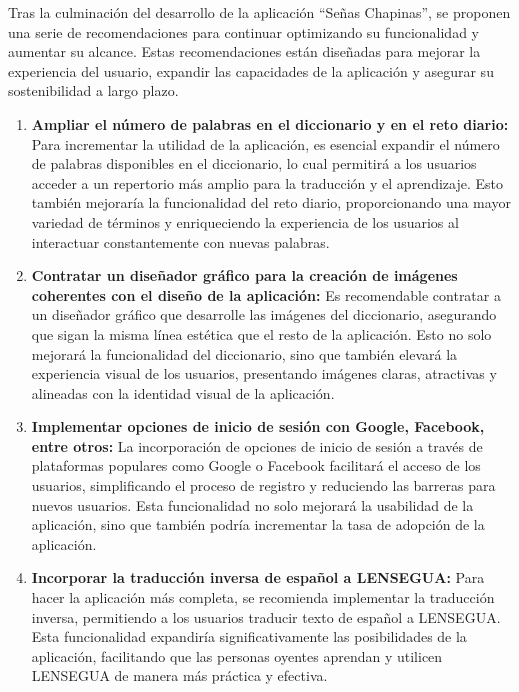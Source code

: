 
Tras la culminación del desarrollo de la aplicación ``Señas Chapinas'', se proponen una serie de recomendaciones para continuar optimizando su funcionalidad y aumentar su alcance. Estas recomendaciones están diseñadas para mejorar la experiencia del usuario, expandir las capacidades de la aplicación y asegurar su sostenibilidad a largo plazo.

\begin{enumerate}
    \item \textbf{Ampliar el número de palabras en el diccionario y en el reto diario:} 
    Para incrementar la utilidad de la aplicación, es esencial expandir el número de palabras disponibles en el diccionario, lo cual permitirá a los usuarios acceder a un repertorio más amplio para la traducción y el aprendizaje. Esto también mejoraría la funcionalidad del reto diario, proporcionando una mayor variedad de términos y enriqueciendo la experiencia de los usuarios al interactuar constantemente con nuevas palabras.

    \item \textbf{Contratar un diseñador gráfico para la creación de imágenes coherentes con el diseño de la aplicación:} 
    Es recomendable contratar a un diseñador gráfico que desarrolle las imágenes del diccionario, asegurando que sigan la misma línea estética que el resto de la aplicación. Esto no solo mejorará la funcionalidad del diccionario, sino que también elevará la experiencia visual de los usuarios, presentando imágenes claras, atractivas y alineadas con la identidad visual de la aplicación.

    \item \textbf{Implementar opciones de inicio de sesión con Google, Facebook, entre otros:} 
    La incorporación de opciones de inicio de sesión a través de plataformas populares como Google o Facebook facilitará el acceso de los usuarios, simplificando el proceso de registro y reduciendo las barreras para nuevos usuarios. Esta funcionalidad no solo mejorará la usabilidad de la aplicación, sino que también podría incrementar la tasa de adopción de la aplicación.

    \item \textbf{Incorporar la traducción inversa de español a LENSEGUA:} 
    Para hacer la aplicación más completa, se recomienda implementar la traducción inversa, permitiendo a los usuarios traducir texto de español a LENSEGUA. Esta funcionalidad expandiría significativamente las posibilidades de la aplicación, facilitando que las personas oyentes aprendan y utilicen LENSEGUA de manera más práctica y efectiva.


\end{enumerate}
